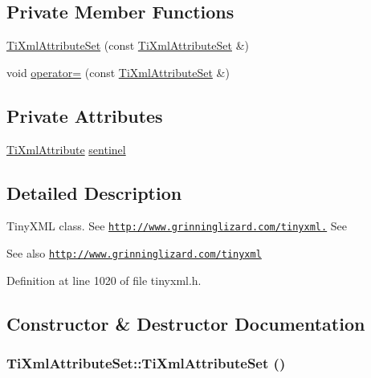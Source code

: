 \subsection*{Private Member Functions}
\begin{DoxyCompactItemize}
\item 
\hyperlink{class_ti_xml_attribute_set_acb244bc616c28b1c4b8e8417f28e5f9e}{TiXmlAttributeSet} (const \hyperlink{class_ti_xml_attribute_set}{TiXmlAttributeSet} \&)
\item 
void \hyperlink{class_ti_xml_attribute_set_a977f5b50c94e7b6beb01875298fa14a2}{operator=} (const \hyperlink{class_ti_xml_attribute_set}{TiXmlAttributeSet} \&)
\end{DoxyCompactItemize}
\subsection*{Private Attributes}
\begin{DoxyCompactItemize}
\item 
\hyperlink{class_ti_xml_attribute}{TiXmlAttribute} \hyperlink{class_ti_xml_attribute_set_a1fda20434a148e7d09dd3ecc8e85db9c}{sentinel}
\end{DoxyCompactItemize}


\subsection{Detailed Description}
TinyXML class. See \href{http://www.grinninglizard.com/tinyxml.}{\tt http://www.grinninglizard.com/tinyxml.} See \begin{DoxySeeAlso}{See also}
\href{http://www.grinninglizard.com/tinyxml}{\tt http://www.grinninglizard.com/tinyxml} 
\end{DoxySeeAlso}


Definition at line 1020 of file tinyxml.h.

\subsection{Constructor \& Destructor Documentation}
\hypertarget{class_ti_xml_attribute_set_a253c33b657cc85a07f7f060b02146c35}{
\subsubsection[{TiXmlAttributeSet}]{\setlength{\rightskip}{0pt plus 5cm}TiXmlAttributeSet::TiXmlAttributeSet ()}}
\label{class_ti_xml_attribute_set_a253c33b657cc85a07f7f060b02146c35}


